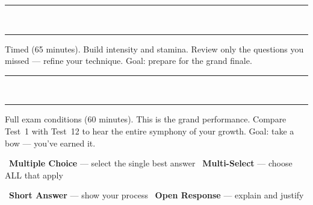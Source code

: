 {\vspace{1mm}
\begin{center}
    \textcolor{musBurgundy!30}{\rule{0.3\linewidth}{0.4pt}}
    \textcolor{musBurgundy!50}{~\faAngleDoubleDown~}
    \textcolor{musBurgundy!30}{\rule{0.3\linewidth}{0.4pt}}
\end{center}
\vspace{1mm}

\noindent
\begin{tcolorbox}[
    enhanced,
    colback=musBlack!5,
    colframe=musBlack!40,
    arc=4pt, boxrule=1.5pt,
    left=5mm, right=5mm, top=3mm, bottom=3mm,
    title={\textcolor{white}{Movement III: Intermezzo (Tests 7--9)}},
    colbacktitle=musBlack!75,
    fonttitle=\bfseries\sffamily,
    borderline west={3pt}{0pt}{musBlack!50},
]
    \small
    Timed (65 minutes). Build intensity and stamina.
    Review only the questions you missed --- refine your technique.
    Goal: prepare for the grand finale.
\end{tcolorbox}

\vspace{1mm}
\begin{center}
    \textcolor{musBlack!30}{\rule{0.3\linewidth}{0.4pt}}
    \textcolor{musBlack!50}{~\faAngleDoubleDown~}
    \textcolor{musBlack!30}{\rule{0.3\linewidth}{0.4pt}}
\end{center}
\vspace{1mm}

\noindent
\begin{tcolorbox}[
    enhanced,
    colback=musIvory,
    colframe=musGold!50,
    arc=4pt, boxrule=1.5pt,
    left=5mm, right=5mm, top=3mm, bottom=3mm,
    title={\textcolor{white}{Movement IV: Finale (Tests 10--12)}},
    colbacktitle=musCrimson!80,
    fonttitle=\bfseries\sffamily,
    borderline west={3pt}{0pt}{musCrimson!60},
]
    \small
    Full exam conditions (60 minutes). This is the grand performance.
    Compare Test~1 with Test~12 to hear the entire symphony of your growth.
    Goal: take a bow --- you've earned it.
\end{tcolorbox}

\vspace{3mm}

\begin{tcolorbox}[
    enhanced,
    colback=musPearl,
    colframe=musBlack!25,
    arc=6pt, boxrule=0.8pt,
    left=5mm, right=5mm, top=3mm, bottom=3mm,
    title={\small\textcolor{white}{\faClipboardList~Score Annotations}},
    colbacktitle=musBlack!65,
    fonttitle=\bfseries\sffamily,
]
    \small
    \textcolor{musGold!90!black}{\faMusic}~\textbf{Multiple Choice} --- select the single best answer\hfill
    \textcolor{musBurgundy}{\faMusic}~\textbf{Multi-Select} --- choose ALL that apply

    \smallskip
    \textcolor{musBlack}{\faMusic}~\textbf{Short Answer} --- show your process\hfill
    \textcolor{musSilver!70!black}{\faMusic}~\textbf{Open Response} --- explain and justify
\end{tcolorbox}

}

\newpage
